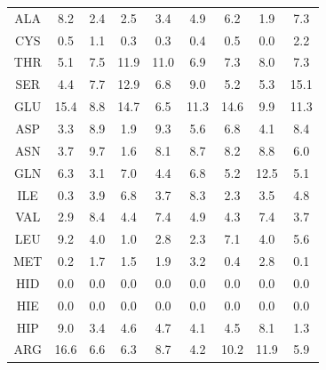 \begin{table}[!htbp]
\begin{tabular}{ccccccccc}
   ALA  & 8.2  &  2.4  &  2.5 &  3.4 &  4.9 & 6.2  &   1.9  &   7.3 \\                                         
   CYS  & 0.5  &  1.1  &  0.3 &  0.3 &  0.4 & 0.5  &   0.0  &   2.2 \\                                           
   THR  & 5.1  & 7.5   & 11.9 & 11.0 & 6.9  & 7.3  &   8.0  &   7.3 \\                                        
        \cmidrule{1-9}
   SER  & 4.4  & 7.7   & 12.9 & 6.8  & 9.0  & 5.2  &   5.3  &   15.1 \\                                          
        \cmidrule{1-9}
   GLU  & 15.4 & 8.8   & 14.7 & 6.5  & 11.3 & 14.6 &   9.9  &   11.3 \\                                           
   ASP  & 3.3  & 8.9   & 1.9  & 9.3  & 5.6  & 6.8  &   4.1  &   8.4 \\                                           
        \cmidrule{1-9}
   ASN  & 3.7  & 9.7   & 1.6  & 8.1  & 8.7  & 8.2  &   8.8  &   6.0 \\                                         
   GLN  & 6.3  & 3.1   & 7.0  & 4.4  & 6.8  & 5.2  &   12.5  &   5.1 \\                                            
        \cmidrule{1-9}
   ILE  & 0.3  & 3.9   & 6.8  & 3.7  & 8.3  & 2.3  &   3.5  &   4.8 \\                                               
   VAL  & 2.9  & 8.4   & 4.4  & 7.4  & 4.9  & 4.3  &   7.4  &   3.7 \\                                        
   LEU  & 9.2  & 4.0   & 1.0  & 2.8  & 2.3  & 7.1  &   4.0  &   5.6 \\                                          
        \cmidrule{1-9}
   MET  & 0.2  & 1.7   & 1.5  & 1.9  & 3.2  & 0.4  &   2.8  &   0.1 \\                                          
        \cmidrule{1-9}
   HID  & 0.0  & 0.0   &  0.0 & 0.0  & 0.0  & 0.0  &   0.0  &   0.0 \\                                         
   HIE  & 0.0  & 0.0   & 0.0  & 0.0  & 0.0  & 0.0  &   0.0  &   0.0 \\                                         
   HIP  & 9.0  & 3.4   & 4.6  & 4.7  & 4.1  & 4.5  &   8.1  &   1.3 \\                                        
        \cmidrule{1-9}
   ARG  & 16.6 & 6.6   & 6.3  & 8.7  & 4.2  & 10.2 &   11.9  &   5.9 \\                                          

\end{tabular}
\end{table}
